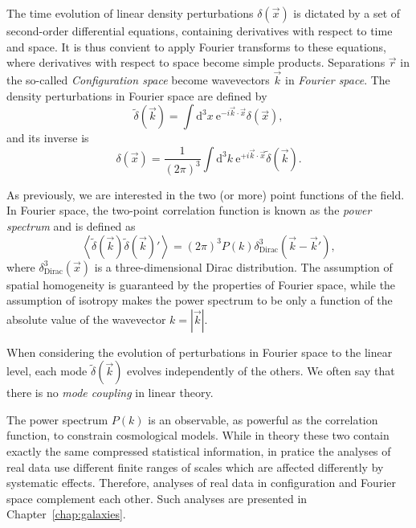     The time evolution of linear density perturbations $\delta(\vec{x})$ 
    is dictated by a set of second-order differential equations, containing 
    derivatives with respect to time and space. 
    It is thus convient to apply Fourier
    transforms to these equations, where derivatives with respect to space 
    become simple products. Separations $\vec{r}$ in the so-called 
    \emph{Configuration space} become wavevectors $\vec{k}$ in 
    \emph{Fourier space}. The density perturbations in Fourier space are
    defined by 
    \begin{equation}
        \tilde{\delta}(\vec{k}) = \int \mathrm{d}^3x \ \mathrm{e}^{- i \vec{k}\cdot\vec{x}} \delta(\vec{x}),
    \end{equation}
    and its inverse is
    \begin{equation}
        \delta(\vec{x}) = \frac{1}{(2\pi)^3}\int \mathrm{d}^3k \ \mathrm{e}^{+i \vec{k}\cdot\vec{x}} \tilde\delta(\vec{k}).
    \end{equation}

    As previously, we are interested in the two (or more) point functions of the
    field. In Fourier space, the two-point correlation function is known as the
    \emph{power spectrum} and is defined as
    \begin{equation}
        \left\langle \tilde\delta(\vec{k}) \tilde\delta(\vec{k})' \right\rangle = (2\pi)^3 P(k) \delta^3_\mathrm{Dirac}(\vec{k}-\vec{k}'),
        \label{eq:power_spectrum_definition}
    \end{equation}
    where $\delta^3_\mathrm{Dirac}(\vec{x})$ is a three-dimensional Dirac distribution.
    The assumption of spatial homogeneity is guaranteed by the properties of Fourier space,
    while the assumption of isotropy makes the power spectrum to be only a function of the
    absolute value of the wavevector $k = |\vec{k}|$. 

    When considering the evolution of perturbations in Fourier space to the linear level,
    each mode $\tilde\delta(\vec{k})$ evolves independently of the others. We often say 
    that there is no \emph{mode coupling} in linear theory. 

    The power spectrum $P(k)$ is an observable, as powerful as the correlation function,
    to constrain cosmological models. While in theory these two contain exactly the
    same compressed statistical information, 
    in pratice the analyses of real data  
    use different finite ranges of scales 
    which are affected differently by 
    systematic effects. 
    Therefore, analyses of real data in configuration and Fourier space 
    complement each other. 
    Such analyses are presented in Chapter~\ref{chap:galaxies}. 

